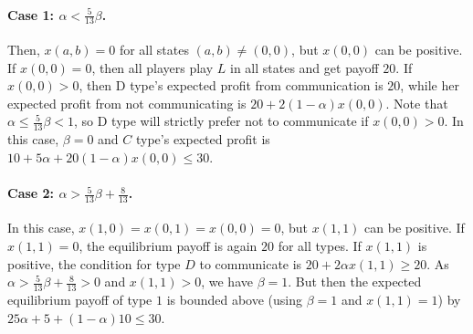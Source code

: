 \documentclass[12pt]{article}
\theoremstyle{break}
\begin{document}
\paragraph{Case 1: $\alpha<\frac{5}{13}\beta$.} Then, $x(a,b)=0$ for all states $(a,b)\neq (0,0)$, but $x(0,0)$ can be positive. If $x(0,0)=0$, then all players play $L$ in all states and get payoff $20$. If $x(0,0)>0$, then D type's expected profit from communication is $20$, while her expected profit from not communicating is $20+2(1-\alpha) x(0,0)$. Note that $\alpha \leq  \frac{5}{13}\beta < 1$, so D type will strictly prefer not to communicate if $x(0,0)>0$. In this case, $\beta=0$ and $C$ type's expected profit is $10+5\alpha+20 (1-\alpha) x(0,0) \leq 30$.

\paragraph{Case 2: $\alpha > \frac{5}{13}\beta+\frac{8}{13}$.} In this case, $x(1,0)=x(0,1)=x(0,0)=0$, but $x(1,1)$ can be positive. If $x(1,1)=0$, the equilibrium payoff is again $20$ for all types. If $x(1,1)$ is positive, the condition for type $D$ to communicate is $20+2\alpha x(1,1) \geq 20$. As $\alpha > \frac{5}{13}\beta+\frac{8}{13}>0$ and $x(1,1)>0$, we have $\beta=1$.  But then the expected equilibrium payoff of type $1$ is bounded above (using $\beta=1$ and $x(1,1)=1$) by $25\alpha+5+(1-\alpha)10\leq 30$.%
\end{document}
